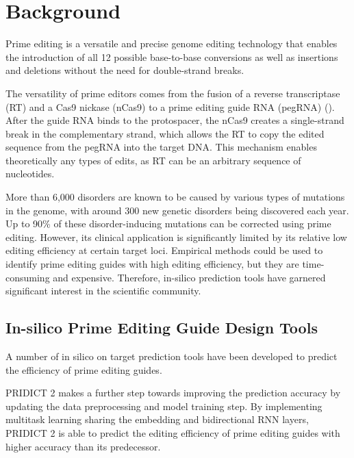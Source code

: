 \section{Background}

Prime editing is a versatile and precise genome editing technology that enables the introduction of all 12 possible base-to-base conversions as well as insertions and deletions without the need for double-strand breaks\cite{liudavidr.SearchreplaceGenomeEditing2019}. 

The versatility of prime editors comes from the fusion of a reverse transcriptase (RT) and a Cas9 nickase (nCas9) to a prime editing guide RNA (pegRNA) (). After the guide RNA binds to the protospacer, the nCas9 creates a single-strand break in the complementary strand, which allows the RT to copy the edited sequence from the pegRNA into the target DNA. This mechanism enables theoretically any types of edits, as RT can be an arbitrary sequence of nucleotides\cite{liudavidr.SearchreplaceGenomeEditing2019}. 

More than 6,000 disorders are known to be caused by various types of mutations in the genome, with around 300 new genetic disorders being discovered each year\cite{petraityteGenomeEditingMedicine2021}. Up to 90\% of these disorder-inducing mutations can be corrected using prime editing\cite{kantorCRISPRCas9DNABaseEditing2020}. However, its clinical application is significantly limited by its relative low editing efficiency at certain target loci.  Empirical methods could be used to identify prime editing guides with high editing efficiency, but they are time-consuming and expensive. Therefore, in-silico prediction tools have garnered significant interest in the scientific community.



\subsection*{In-silico Prime Editing Guide Design Tools}

A number of in silico on target prediction tools have been developed to predict the efficiency of prime editing guides. 

PRIDICT 2 makes a further step towards improving the prediction accuracy by updating the data preprocessing and model training step. By implementing multitask learning sharing the embedding and bidirectional RNN layers, PRIDICT 2 is able to predict the editing efficiency of prime editing guides with higher accuracy than its predecessor\cite{mathisMachineLearningPrediction2024}. 

\begin{figure}
    
\end{figure}